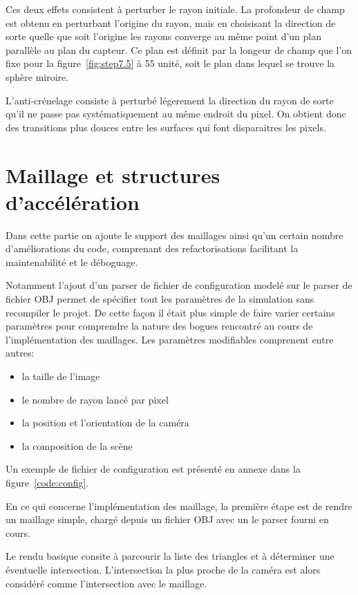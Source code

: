 \documentclass[12pt]{article}
\begin{document}
Ces deux effets consistent à perturber le rayon initiale.
La profondeur de champ est obtenu en perturbant l'origine du rayon, mais en choisisant la direction de sorte quelle que soit l'origine les rayons converge au même point d'un plan parallèle au plan du capteur.
Ce plan est définit par la longeur de champ que l'on fixe pour la figure~\ref{fig:step7.5} à 55 unité, soit le plan dans lequel se trouve la sphère miroire.

L'anti-crénelage consiste à perturbé légerement la direction du rayon de sorte qu'il ne passe pas systématiquement au même endroit du pixel.
On obtient donc des transitions plus douces entre les surfaces qui font disparaitres les pixels.

\section{Maillage et structures d'accélération\label{sec:mesh}}

Dans cette partie on ajoute le support des maillages ainsi qu'un certain nombre d'améliorations du code, comprenant des refactorisations facilitant la maintenabilité et le déboguage.

Notamment l'ajout d'un parser de fichier de configuration modelé sur le parser de fichier OBJ permet de spécifier tout les paramètres de la simulation sans recompiler le projet.
De cette façon il était plus simple de faire varier certains paramètres pour comprendre la nature des bogues rencontré au cours de l'implémentation des maillages.
Les paramètres modifiables comprenent entre autres:
\begin{itemize}
    \item la taille de l'image
    \item le nombre de rayon lancé par pixel
    \item la position et l'orientation de la caméra
    \item la composition de la scène
\end{itemize}

Un exemple de fichier de configuration est présenté en annexe dans la figure~\ref{code:config}. 

En ce qui concerne l'implémentation des maillage, la première étape est de rendre un maillage simple, chargé depuis un fichier OBJ avec un le parser fourni en cours.

Le rendu basique consite à parcourir la liste des triangles et à déterminer une éventuelle intersection.
L'intersection la plus proche de la caméra est alors considéré comme l'intersection avec le maillage.
\end{document}
